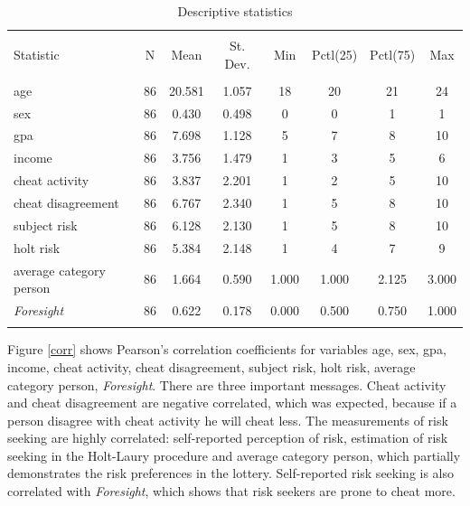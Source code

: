 \documentclass[12pt]{article}
\begin{document}
	\begin{table}[!htbp] \centering 
		  \caption{Descriptive statistics} 
		  \label{description} 
		\begin{tabular}{@{\extracolsep{-1pt}}lccccccc} 
		\hline \\[-1.8ex] 
		Statistic & \multicolumn{1}{c}{N} & \multicolumn{1}{c}{Mean} & \multicolumn{1}{c}{St. Dev.} & \multicolumn{1}{c}{Min} & \multicolumn{1}{c}{Pctl(25)} & \multicolumn{1}{c}{Pctl(75)} & \multicolumn{1}{c}{Max} \\ 
		\hline \\[-1.8ex] 
		age & 86 & 20.581 & 1.057 & 18 & 20 & 21 & 24 \\ 
		sex & 86 & 0.430 & 0.498 & 0 & 0 & 1 & 1 \\ 
		gpa & 86 & 7.698 & 1.128 & 5 & 7 & 8 & 10 \\ 
		income & 86 & 3.756 & 1.479 & 1 & 3 & 5 & 6 \\ 
		cheat activity & 86 & 3.837 & 2.201 & 1 & 2 & 5 & 10 \\ 
		cheat disagreement & 86 & 6.767 & 2.340 & 1 & 5 & 8 & 10 \\ 
		subject risk & 86 & 6.128 & 2.130 & 1 & 5 & 8 & 10 \\ 
		holt risk & 86 & 5.384 & 2.148 & 1 & 4 & 7 & 9 \\ 
		average category person& 86 & 1.664 & 0.590 & 1.000 & 1.000 & 2.125 & 3.000 \\ 
		\textit{Foresight} & 86 & 0.622 & 0.178 & 0.000 & 0.500 & 0.750 & 1.000 \\ 
		\hline \\[-1.8ex] 
		\end{tabular} 
	\end{table}


	Figure \ref{corr} shows Pearson's correlation coefficients for variables age, sex, gpa, income, cheat activity, cheat disagreement, subject risk, holt risk, average category person, \textit{Foresight}. There are three important messages. Cheat activity and cheat disagreement are negative correlated, which was expected, because if a person disagree with cheat activity he will cheat less. The measurements of risk seeking are highly correlated: self-reported perception of risk, estimation of risk seeking in the Holt-Laury procedure and average category person, which partially demonstrates the risk preferences in the lottery. Self-reported risk seeking is also correlated with \textit{Foresight}, which shows that risk seekers are prone to cheat more.
	
\end{document}
